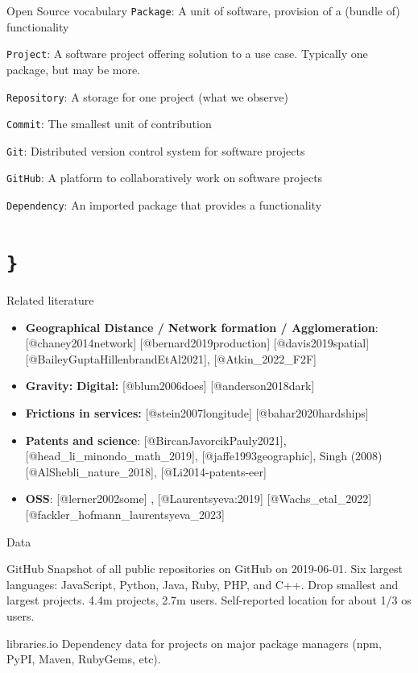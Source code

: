\documentclass[
  ignorenonframetext,
  aspectratio=1610,
]{beamer}
\providecommand{\tightlist}{%
  \setlength{\itemsep}{0pt}\setlength{\parskip}{0pt}}
\begin{document}
\begin{frame}[fragile]{Open Source vocabulary}
\protect\hypertarget{open-source-vocabulary}{}
\texttt{Package}: A unit of software, provision of a (bundle of)
functionality

\texttt{Project}: A software project offering solution to a use case.
Typically one package, but may be more.

\texttt{Repository}: A storage for one project (what we observe)

\texttt{Commit}: The smallest unit of contribution

\texttt{Git}: Distributed version control system for software projects

\texttt{GitHub}: A platform to collaboratively work on software projects

\texttt{Dependency}: An imported package that provides a functionality
\end{frame}

\section{\texorpdfstring{\texttt{\}}}{\}}}\label{section}

\begin{frame}{Related literature}
\protect\hypertarget{related-literature}{}
\begin{itemize}
\tightlist
\item
  \textbf{Geographical Distance / Network formation / Agglomeration}:
  {[}@chaney2014network{]} {[}@bernard2019production{]}
  {[}@davis2019spatial{]} {[}@BaileyGuptaHillenbrandEtAl2021{]},
  {[}@Atkin\_2022\_F2F{]}
\item
  \textbf{Gravity:} \textbf{Digital:} {[}@blum2006does{]}
  {[}@anderson2018dark{]}
\item
  \textbf{Frictions in services:} {[}@stein2007longitude{]}
  {[}@bahar2020hardships{]}
\item
  \textbf{Patents and science}: {[}@BircanJavorcikPauly2021{]},
  {[}@head\_li\_minondo\_math\_2019{]}, {[}@jaffe1993geographic{]},
  Singh (2008) {[}@AlShebli\_nature\_2018{]}, {[}@Li2014-patents-eer{]}
\item
  \textbf{OSS}: {[}@lerner2002some{]} , {[}@Laurentsyeva:2019{]}
  {[}@Wachs\_etal\_2022{]} {[}@fackler\_hofmann\_laurentsyeva\_2023{]}
\end{itemize}
\end{frame}

\begin{frame}{Data}
\protect\hypertarget{data}{}
\begin{block}{GitHub}
\protect\hypertarget{github}{}
Snapshot of all public repositories on GitHub on 2019-06-01. Six largest
languages: JavaScript, Python, Java, Ruby, PHP, and C++. Drop smallest
and largest projects. 4.4m projects, 2.7m users. Self-reported location
for about 1/3 os users.
\end{block}

\begin{block}{libraries.io}
\protect\hypertarget{libraries.io}{}
Dependency data for projects on major package managers (npm, PyPI,
Maven, RubyGems, etc).
\end{block}
\end{frame}
\end{document}
